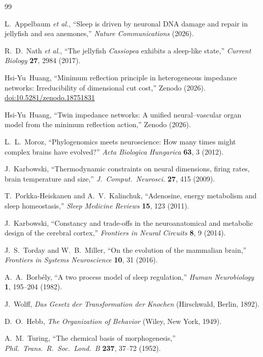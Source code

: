 ﻿\documentclass[aps,pre,twocolumn,superscriptaddress,floatfix]{revtex4-2}
\begin{document}
\begin{thebibliography}{99}

L.~Appelbaum \emph{et al.},
``Sleep is driven by neuronal DNA damage and repair
in jellyfish and sea anemones,''
\emph{Nature Communications} (2026).

R.~D.~Nath \emph{et al.},
``The jellyfish \textit{Cassiopea} exhibits a sleep-like state,''
\emph{Current Biology} \textbf{27}, 2984 (2017).

Hsi-Yu~Huang,
``Minimum reflection principle in heterogeneous impedance networks:
Irreducibility of dimensional cut cost,''
Zenodo (2026).
\href{https://doi.org/10.5281/zenodo.18751831}{doi:10.5281/zenodo.18751831}

Hsi-Yu~Huang,
``Twin impedance networks: A unified neural--vascular organ model
from the minimum reflection action,''
Zenodo (2026).

L.~L.~Moroz,
``Phylogenomics meets neuroscience:
How many times might complex brains have evolved?''
\emph{Acta Biologica Hungarica} \textbf{63}, 3 (2012).

J.~Karbowski,
``Thermodynamic constraints on neural dimensions, firing rates,
brain temperature and size,''
\emph{J.\ Comput.\ Neurosci.} \textbf{27}, 415 (2009).

T.~Porkka-Heiskanen and A.~V.~Kalinchuk,
``Adenosine, energy metabolism and sleep homeostasis,''
\emph{Sleep Medicine Reviews} \textbf{15}, 123 (2011).

J.~Karbowski,
``Constancy and trade-offs in the neuroanatomical
and metabolic design of the cerebral cortex,''
\emph{Frontiers in Neural Circuits} \textbf{8}, 9 (2014).

J.~S.~Torday and W.~B.~Miller,
``On the evolution of the mammalian brain,''
\emph{Frontiers in Systems Neuroscience} \textbf{10}, 31 (2016).

A.~A.~Borb\'{e}ly,
``A two process model of sleep regulation,''
\emph{Human Neurobiology} \textbf{1}, 195--204 (1982).

J.~Wolff,
\emph{Das Gesetz der Transformation der Knochen}
(Hirschwald, Berlin, 1892).

D.~O.~Hebb,
\emph{The Organization of Behavior}
(Wiley, New York, 1949).

A.~M.~Turing,
``The chemical basis of morphogenesis,''
\emph{Phil.\ Trans.\ R.\ Soc.\ Lond.\ B}
\textbf{237}, 37--72 (1952).

\end{thebibliography}
\end{document}
